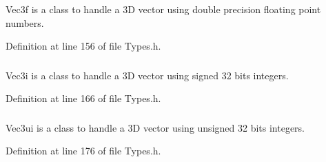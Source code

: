 Vec3f is a class to handle a 3D vector using double precision floating point numbers. 



Definition at line 156 of file Types.h.

\hypertarget{namespace_utilities_a49caf0d054fbd5f9eb148ed40ad97dcc}{
\subsubsection[{Vec3i}]{}}
\label{namespace_utilities_a49caf0d054fbd5f9eb148ed40ad97dcc}


Vec3i is a class to handle a 3D vector using signed 32 bits integers. 



Definition at line 166 of file Types.h.

\hypertarget{namespace_utilities_ad931f5df25ecb686d1b3aea12bdc9d06}{
\subsubsection[{Vec3ui}]{}}
\label{namespace_utilities_ad931f5df25ecb686d1b3aea12bdc9d06}


Vec3ui is a class to handle a 3D vector using unsigned 32 bits integers. 



Definition at line 176 of file Types.h.



